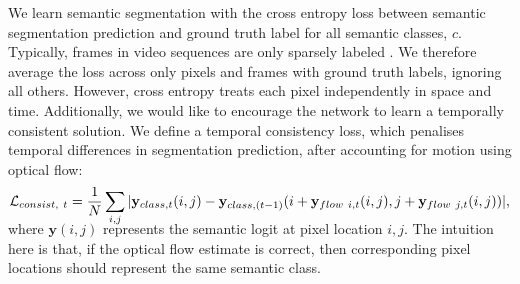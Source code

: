 We learn semantic segmentation with the cross entropy loss between semantic segmentation prediction and ground truth label for all semantic classes, $c$.
Typically, frames in video sequences are only sparsely labeled \cite{Cordts2016Cityscapes}. We therefore average the loss across only pixels and frames with ground truth labels, ignoring all others.
However, cross entropy treats each pixel independently in space and time. Additionally, we would like to encourage the network to learn a temporally consistent solution. We define a temporal consistency loss, which penalises temporal differences in segmentation prediction, after accounting for motion using optical flow:
\begin{multline}
\vspace{-1mm}
\mathcal{L}_{consist,~t} = \frac{1}{N} \sum_{i,j} | \mathbf{y}_{class,t}(i,j) - \mathbf{y}_{class,(t-1)}(i+\mathbf{y}_{flow~i,t}(i,j),j+\mathbf{y}_{flow~j,t}(i,j)) |,
\label{eqn:consistency}
\vspace{-3mm}
\end{multline}
where $\mathbf{y}(i,j)$ represents the semantic logit at pixel location $i,j$. The intuition here is that, if the optical flow estimate is correct, then corresponding pixel locations should represent the same semantic class.

